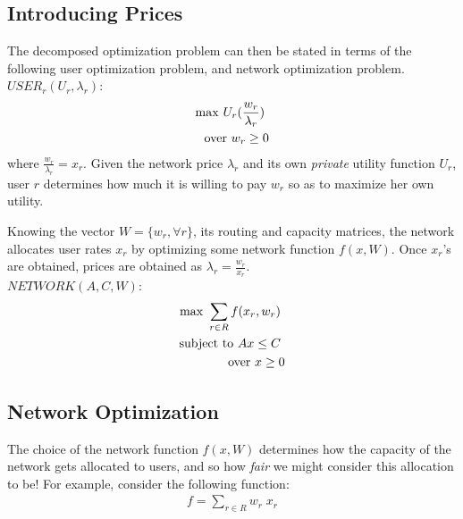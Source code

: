 \documentclass{article}
\begin{document}
\subsection{Introducing Prices}

The decomposed optimization problem can then be stated in terms of the following user optimization problem, and network optimization problem. \\

$USER_r(U_r, \lambda_r):$
\begin{eqnarray*}
{\rm max}\ U_r(\frac{w_r}{\lambda_r}) \ \\
{\rm over}\ w_r \geq 0 
\end{eqnarray*}
where $\frac{w_r}{\lambda_r} = x_r $. Given the network price $\lambda_r$ and its own {\em private} utility function $U_r$, user $r$ determines how much it is willing to pay $w_r$ so as to maximize her own utility.

Knowing the vector $W=\{ w_r, \forall r \}$, its routing and capacity matrices, the network allocates user rates $x_r$ by optimizing some network function $f(x,W)$. Once $x_r$'s are obtained, 
prices are obtained as $\lambda_r = \frac{w_r}{x_r}$.\\

$NETWORK(A, C, W):$
\begin{eqnarray*}
{\rm max}\ \sum_{r \in R} f(x_r, w_r) \ \\
{\rm subject~to}\ A x \leq C \ \\
{\rm over}\ x \geq 0
\end{eqnarray*}

\subsection{Network Optimization}

The choice of the network function $f(x,W)$ determines how the capacity of the network gets allocated to users, and so how {\em fair} we might consider this allocation to be! For example, consider the following function:
\begin{eqnarray*}
f = \sum_{r \in R} w_r\; x_r
\end{eqnarray*}
\end{document}
